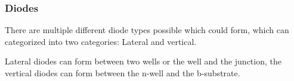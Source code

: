 \subsubsection{Diodes}
There are multiple different diode types possible which could form, which can categorized into two categories: Lateral and vertical.

Lateral diodes can form between two wells or the well and the junction, the vertical diodes can form between the n-well and the b-substrate.